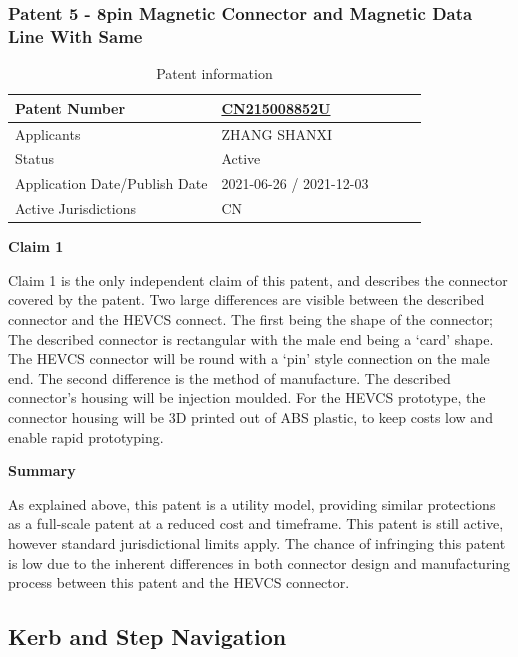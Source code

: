\documentclass [12pt]{article}
\begin{document}
\subsubsection{Patent 5 - 8pin Magnetic Connector and Magnetic Data Line With Same}
\begin{table}[H]
    \centering
    \setlength{\arrayrulewidth}{1.5pt}
    \begin{tabular}{|p{0.5\linewidth}|p{0.5\linewidth}|}
    \hline
    Patent Number & \href{https://worldwide.espacenet.com/patent/search/family/079083033/publication/CN215008852U?q=CN215008852U}{CN215008852U}\\
    \hline
    Applicants &ZHANG SHANXI\\
    \hline
    Status & Active\\
    \hline
    Application Date/Publish Date & 2021-06-26 / 2021-12-03\\
    \hline
    Active Jurisdictions & CN\\
    \hline
    \end{tabular}
    \caption{Patent information}
    \label{table:mag_con5}
\end{table}
\textbf{Claim 1}

Claim 1 is the only independent claim of this patent, and describes the connector covered by the patent. Two large differences are visible between the described connector and the HEVCS connect. The first being the shape of the connector; The described connector is rectangular with the male end being a ‘card’ shape. The HEVCS connector will be round with a ‘pin’ style connection on the male end.
The second difference is the method of manufacture. The described connector’s housing will be injection moulded. For the HEVCS prototype, the connector housing will be 3D printed out of ABS plastic, to keep costs low and enable rapid prototyping.

\textbf{Summary}

As explained above, this patent is a utility model, providing similar protections as a full-scale patent at a reduced cost and timeframe. This patent is still active, however standard jurisdictional limits apply. The chance of infringing this patent is low due to the inherent differences in both connector design and manufacturing process between this patent and the HEVCS connector.


\subsection{Kerb and Step Navigation}\label{sec:kerb_step_navigation}
\end{document}
